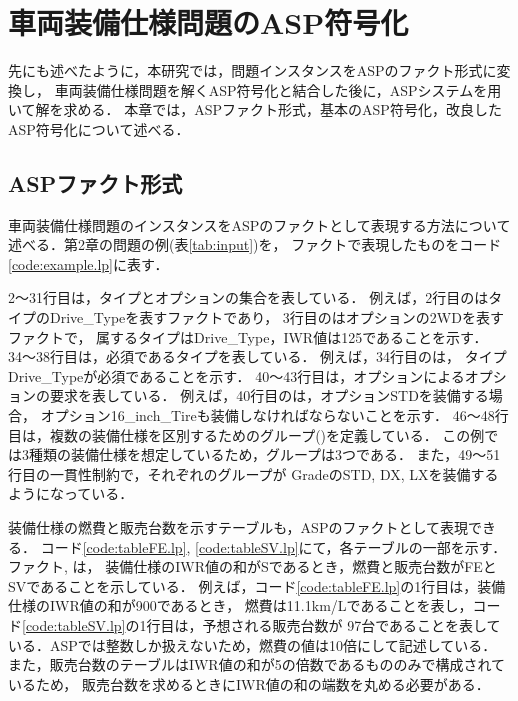 \chapter{車両装備仕様問題のASP符号化}

先にも述べたように，本研究では，問題インスタンスをASPのファクト形式に変換し，
車両装備仕様問題を解くASP符号化と結合した後に，ASPシステムを用いて解を求める．
本章では，ASPファクト形式，基本のASP符号化，改良したASP符号化について述べる．

\section{ASPファクト形式}


車両装備仕様問題のインスタンスをASPのファクトとして表現する方法について述べる．第2章の問題の例(表\ref{tab:input})を，
ファクトで表現したものをコード\ref{code:example.lp}に表す．

2〜31行目は，タイプとオプションの集合を表している．
例えば，2行目のはタイプのDrive\_Typeを表すファクトであり，
3行目のはオプションの2WDを表すファクトで，
属するタイプはDrive\_Type，IWR値は125であることを示す．
%
34〜38行目は，必須であるタイプを表している．
例えば，34行目のは，
タイプDrive\_Typeが必須であることを示す．
%
40〜43行目は，オプションによるオプションの要求を表している．
例えば，40行目のは，オプションSTDを装備する場合，
オプション16\_inch\_Tireも装備しなければならないことを示す．
%
46〜48行目は，複数の装備仕様を区別するためのグループ()を定義している．
この例では3種類の装備仕様を想定しているため，グループは3つである．
また，49〜51行目の一貫性制約で，それぞれのグループが
GradeのSTD, DX, LXを装備するようになっている．

装備仕様の燃費と販売台数を示すテーブルも，ASPのファクトとして表現できる．
コード\ref{code:tableFE.lp}, \ref{code:tableSV.lp}にて，各テーブルの一部を示す．
ファクト, は，
装備仕様のIWR値の和がSであるとき，燃費と販売台数がFEとSVであることを示している．
例えば，コード\ref{code:tableFE.lp}の1行目は，装備仕様のIWR値の和が900であるとき，
燃費は11.1km/Lであることを表し，コード\ref{code:tableSV.lp}の1行目は，予想される販売台数が
97台であることを表している．ASPでは整数しか扱えないため，燃費の値は10倍にして記述している．
また，販売台数のテーブルはIWR値の和が5の倍数であるもののみで構成されているため，
販売台数を求めるときにIWR値の和の端数を丸める必要がある．





